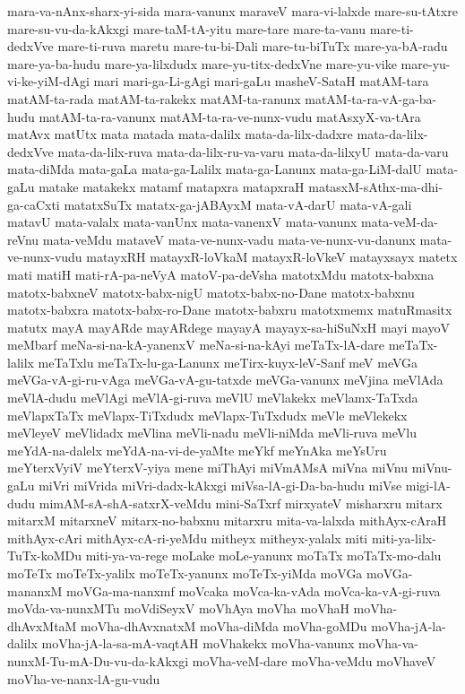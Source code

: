 {mara-va-nAnx-sharx-yi-sida
mara-vanunx
maraveV
mara-vi-lalxde
mare-su-tAtxre
mare-su-vu-da-kAkxgi
mare-taM-tA-yitu
mare-tare
mare-ta-vanu
mare-ti-dedxVve
mare-ti-ruva
maretu
mare-tu-bi-Dali
mare-tu-biTuTx
mare-ya-bA-radu
mare-ya-ba-hudu
mare-ya-lilxdudx
mare-yu-titx-dedxVne
mare-yu-vike
mare-yu-vi-ke-yiM-dAgi
mari
mari-ga-Li-gAgi
mari-gaLu
masheV-SataH
matAM-tara
matAM-ta-rada
matAM-ta-rakekx
matAM-ta-ranunx
matAM-ta-ra-vA-ga-ba-hudu
matAM-ta-ra-vanunx
matAM-ta-ra-ve-nunx-vudu
matAsxyX-va-tAra
matAvx
matUtx
mata
matada
mata-dalilx
mata-da-lilx-dadxre
mata-da-lilx-dedxVve
mata-da-lilx-ruva
mata-da-lilx-ru-va-varu
mata-da-lilxyU
mata-da-varu
mata-diMda
mata-gaLa
mata-ga-Lalilx
mata-ga-Lanunx
mata-ga-LiM-dalU
mata-gaLu
matake
matakekx
matamf
matapxra
matapxraH
matasxM-sAthx-ma-dhi-ga-caCxti
matatxSuTx
matatx-ga-jABAyxM
mata-vA-darU
mata-vA-gali
matavU
mata-valalx
mata-vanUnx
mata-vanenxV
mata-vanunx
mata-veM-da-reVnu
mata-veMdu
mataveV
mata-ve-nunx-vadu
mata-ve-nunx-vu-danunx
mata-ve-nunx-vudu
matayxRH
matayxR-loVkaM
matayxR-loVkeV
matayxsayx
matetx
mati
matiH
mati-rA-pa-neVyA
matoV-pa-deVsha
matotxMdu
matotx-babxna
matotx-babxneV
matotx-babx-nigU
matotx-babx-no-Dane
matotx-babxnu
matotx-babxra
matotx-babx-ro-Dane
matotx-babxru
matotxmemx
matuRmasitx
matutx
mayA
mayARde
mayARdege
mayayA
mayayx-sa-hiSuNxH
mayi
mayoV
meMbarf
meNa-si-na-kA-yanenxV
meNa-si-na-kAyi
meTaTx-lA-dare
meTaTx-lalilx
meTaTxlu
meTaTx-lu-ga-Lanunx
meTirx-kuyx-leV-Sanf
meV
meVGa
meVGa-vA-gi-ru-vAga
meVGa-vA-gu-tatxde
meVGa-vanunx
meVjina
meVlAda
meVlA-dudu
meVlAgi
meVlA-gi-ruva
meVlU
meVlakekx
meVlamx-TaTxda
meVlapxTaTx
meVlapx-TiTxdudx
meVlapx-TuTxdudx
meVle
meVlekekx
meVleyeV
meVlidadx
meVlina
meVli-nadu
meVli-niMda
meVli-ruva
meVlu
meYdA-na-dalelx
meYdA-na-vi-de-yaMte
meYkf
meYnAka
meYsUru
meYterxVyiV
meYterxV-yiya
mene
miThAyi
miVmAMsA
miVna
miVnu
miVnu-gaLu
miVri
miVrida
miVri-dadx-kAkxgi
miVsa-lA-gi-Da-ba-hudu
miVse
migi-lA-dudu
mimAM-sA-shA-satxrX-veMdu
mini-SaTxrf
mirxyateV
misharxru
mitarx
mitarxM
mitarxneV
mitarx-no-babxnu
mitarxru
mita-va-lalxda
mithAyx-cAraH
mithAyx-cAri
mithAyx-cA-ri-yeMdu
mitheyx
mitheyx-yalalx
miti
miti-ya-lilx-TuTx-koMDu
miti-ya-va-rege
moLake
moLe-yanunx
moTaTx
moTaTx-mo-dalu
moTeTx
moTeTx-yalilx
moTeTx-yanunx
moTeTx-yiMda
moVGa
moVGa-mananxM
moVGa-ma-nanxmf
moVcaka
moVca-ka-vAda
moVca-ka-vA-gi-ruva
moVda-va-nunxMTu
moVdiSeyxV
moVhAya
moVha
moVhaH
moVha-dhAvxMtaM
moVha-dhAvxnatxM
moVha-diMda
moVha-goMDu
moVha-jA-la-dalilx
moVha-jA-la-sa-mA-vaqtAH
moVhakekx
moVha-vanunx
moVha-va-nunxM-Tu-mA-Du-vu-da-kAkxgi
moVha-veM-dare
moVha-veMdu
moVhaveV
moVha-ve-nanx-lA-gu-vudu
}
